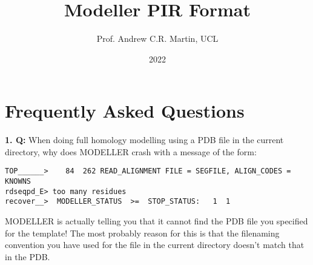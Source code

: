 \documentclass[12pt]{article}
\title{Modeller PIR Format}
\author{Prof. Andrew C.R. Martin, UCL}
\date{2022}
\begin{document}
\maketitle




\section{Frequently Asked Questions}

{\bfseries 1. Q:} When doing full homology modelling using a PDB file
in the current directory, why does MODELLER crash with a message of
the form:
\begin{verbatim}
TOP______>    84  262 READ_ALIGNMENT FILE = SEGFILE, ALIGN_CODES = KNOWNS
rdseqpd_E> too many residues
recover__>  MODELLER_STATUS  >=  STOP_STATUS:   1  1
\end{verbatim}

 MODELLER is actually telling you that it cannot find
the PDB file you specified for the template! The most probably reason
for this is that the filenaming convention you have used for the file
in the current directory doesn't match that in the PDB.
\vspace{1em}
\end{document}
